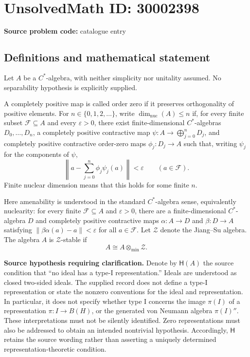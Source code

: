 \documentclass[11pt]{article}
\begin{document}
\section*{UnsolvedMath ID: 30002398}
\textbf{Source problem code:} catalogue entry
\subsection{Definitions and mathematical statement}
Let \(A\) be a \(C^*\)-algebra, with neither simplicity nor unitality assumed. No separability hypothesis is explicitly supplied.

A completely positive map is called order zero if it preserves orthogonality of positive elements. For \(n\in\{0,1,2,\ldots\}\), write \(\dim_{\mathrm{nuc}}(A)\leq n\) if, for every finite subset \(\mathcal F\subseteq A\) and every \(\varepsilon>0\), there exist finite-dimensional \(C^*\)-algebras \(D_0,\ldots,D_n\), a completely positive contractive map \(\psi:A\to\bigoplus_{j=0}^n D_j\), and completely positive contractive order-zero maps \(\phi_j:D_j\to A\) such that, writing \(\psi_j\) for the components of \(\psi\),
\[
\left\|a-\sum_{j=0}^n\phi_j\psi_j(a)\right\|<\varepsilon
\qquad(a\in\mathcal F).
\]
Finite nuclear dimension means that this holds for some finite \(n\).

Here amenability is understood in the standard \(C^*\)-algebra sense, equivalently nuclearity: for every finite \(\mathcal F\subseteq A\) and \(\varepsilon>0\), there are a finite-dimensional \(C^*\)-algebra \(D\) and completely positive contractive maps \(\alpha:A\to D\) and \(\beta:D\to A\) satisfying \(\|\beta\alpha(a)-a\|<\varepsilon\) for all \(a\in\mathcal F\). Let \(\mathcal Z\) denote the Jiang--Su algebra. The algebra \(A\) is \(\mathcal Z\)-stable if
\[
A\cong A\otimes_{\min}\mathcal Z.
\]

\textbf{Source hypothesis requiring clarification.} Denote by \(\mathsf H(A)\) the source condition that ``no ideal has a type-I representation.'' Ideals are understood as closed two-sided ideals. The supplied record does not define a type-I representation or state the nonzero conventions for the ideal and representation. In particular, it does not specify whether type I concerns the image \(\pi(I)\) of a representation \(\pi:I\to B(H)\), or the generated von Neumann algebra \(\pi(I)''\). These interpretations must not be silently identified. Zero representations must also be addressed to obtain an intended nontrivial hypothesis. Accordingly, \(\mathsf H\) retains the source wording rather than asserting a uniquely determined representation-theoretic condition.
\end{document}
